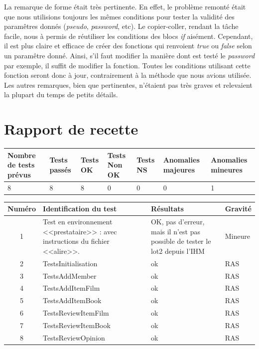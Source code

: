 \documentclass[12pt,a4paper]{report}
\begin{document}
La remarque de forme était très pertinente. En effet, le problème remonté était que nous utilisions toujours les mêmes conditions pour tester la validité des paramêtres donnés (\emph{pseudo}, \emph{password}, etc). Le copier-coller, rendant la tâche facile, nous à permis de réutiliser les conditions des blocs \emph{if} aisément. Cependant, il est plus claire et efficace de créer des fonctions qui renvoient \emph{true} ou \emph{false} selon un paramêtre donné. Ainsi, s'il faut modifier la manière dont est testé le \emph{password} par exemple, il suffit de modifier la fonction. Toutes les conditions utilisant cette fonction seront donc à jour, contrairement à la méthode que nous avions utilisée.\\

Les autres remarques, bien que pertinentes, n'étaient pas très graves et relevaient la plupart du temps de petits détails.

\chapter*{Rapport de recette}
\label{chapter:Rapport de recette} %

\begin{tabular}{|p{2.1cm}|p{1.5cm}|p{1.5cm}|p{1.5cm}|p{1.5cm}|p{2cm}|p{2cm}|}
\hline 
Nombre de tests prévus & Tests passés & Tests OK & Tests Non OK & Tests NS & Anomalies majeures & Anomalies mineures \\ 
\hline 
8 & 8 & 8 & 0 & 0 & 0 & 1 \\ 
\hline 
\end{tabular} 

\begin{tabular}{|c|p{4cm}|p{4cm}|p{4cm}|} 
\hline 
Numéro & Identification du test & Résultats & Gravité \\ 
\hline 
1 & Test en environnement <<prestataire>> : avec instructions du fichier <<alire>>. & OK, pas d'erreur, mais il n'est pas possible de tester le lot2 depuis l'IHM & Mineure \\ 
\hline 
2 & TestsInitialisation & ok & RAS \\ 
\hline 
3 & TestsAddMember & ok & RAS \\ 
\hline 
4 & TestsAddItemFilm & ok & RAS \\ 
\hline 
5 & TestsAddItemBook & ok & RAS \\ 
\hline 
6 & TestsReviewItemFilm & ok & RAS \\ 
\hline 
7 & TestsReviewItemBook & ok & RAS \\ 
\hline 
8 & TestsReviewOpinion & ok & RAS \\ 
\hline 
\end{tabular}\\
\end{document}
